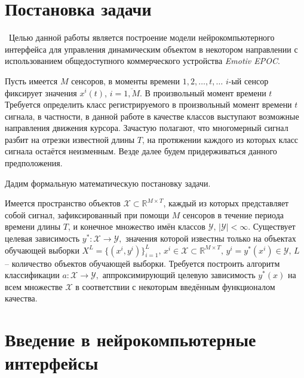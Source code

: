 \documentclass[12pt,fleqn]{article}
\begin{document}
\clearpage 

\section{Постановка задачи}
	\quad\,\,\,Целью данной работы является построение модели нейрокомпьютерного интерфейса для управления динамическим объектом в некотором направлении с использованием общедоступного коммерческого устройства {\it Emotiv EPOC}.
 	\par Пусть имеется $M$ сенсоров, в моменты времени $1, 2, \dots, t, \dots$ $i$-ый сенсор фиксирует значения $x^i(t)$, $i = \overline{1,M}.$ В произвольный момент времени $t$ Требуется определить класс регистрируемого в произвольный момент времени $t$ сигнала, в частности, в данной работе в качестве классов выступают возможные направления движения курсора. Зачастую полагают, что многомерный сигнал разбит на отрезки известной длины $T$, на протяжении каждого из которых класс сигнала остаётся неизменным. Везде далее будем придерживаться данного предположения.
	\par Дадим формальную математическую постановку задачи.
	\par Имеется пространство объектов $\mathcal{X} \subset \mathbb{R}^{M \times T}$, каждый из которых представляет собой сигнал, зафиксированный при помощи $M$ сенсоров в течение периода времени длины $T$, и конечное множество имён классов $\mathcal{Y}, \, |\mathcal{Y}| < \infty$. Существует целевая зависимость $y^*: \mathcal{X} \to \mathcal{Y},$ значения которой известны только на объектах обучающей выборки $X^L = \{ (x^i, y^i)\}_{i=1}^L, \, x^i \in \mathcal{X} \subset \mathbb{R}^{M \times T}, \, y^i = y^*(x^i) \in \mathcal{Y}, \, L$ -- количество объектов обучающей выборки. Требуется построить алгоритм классификации $a: \mathcal{X} \to \mathcal{Y},$ аппроксимирующий целевую зависимость $y^*(x)$ на всем множестве $\mathcal{X}$ в соответствии с некоторым введённым функционалом качества.

\clearpage 

\section{Введение в нейрокомпьютерные интерфейсы}
\end{document}
